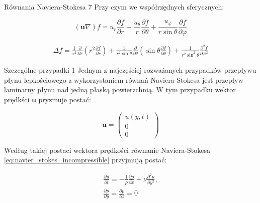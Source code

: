 \documentclass{beamer}
\begin{document}
\begin{frame}{Równania Naviera-Stokesa 7}
	Przy czym we współrzędnych sferycznych:

	\begin{equation}
		(\textbf{u}\nabla)f = u_r \frac{\partial f}{\partial r} +
		\frac{u_\theta}{r}\frac{\partial f}{\partial \theta} +
		\frac{u_\varphi}{r \sin \theta} \frac{\partial f}{\partial \varphi}
	\label{eq:convective_sphere}
	\end{equation}

	\begin{equation}
		\begin{split}
			\Delta f = \frac{1}{r^2}\frac{\partial}{\partial r}\left(r^2
			\frac{\partial f}{\partial r}\right) +
			\frac{1}{r^2 \sin \theta} \frac{\partial}{\partial \theta}
			\left(\sin \theta \frac{\partial f}{\partial \theta}\right) +
			 \frac{1}{r^2 \sin^2 \theta} \frac{\partial^2 f}{\partial \varphi^2}
		\end{split}
	\label{eq:laplace_sphere}
	\end{equation}
\end{frame}

\begin{frame}{Szczególne przypadki 1}
	Jednym z najczęściej rozważanych przypadków przepływu płynu lepkościowego
	z wykorzystaniem równań Naviera-Stokesa jest przepływ laminarny płynu
	nad jedną płaską powierzchnią. W tym przypadku wektor prędkści 
	\textbf{u} pryzmuje postać:

	\begin{equation}
		\textbf{u} = \begin{pmatrix}
		u(y,t) \\
		0 \\
		0
		\end{pmatrix}
		\label{eq:1stex_vel}
	\end{equation}

	Według takiej postaci wektora prędkości równanie Naviera-Stokesa \eqref{eq:navier_stokes_incompressible}
	przyjmują postać:

	\begin{equation}
		\begin{split}
		\frac{\partial u}{\partial t} = -\frac{1}{\rho} \frac{\partial p}{\partial x} +
		\nu \frac{\partial^2 u}{\partial y^2}, \\
		\frac{\partial p}{\partial y} = \frac{\partial p}{\partial z} = 0
		\end{split}
	\end{equation}
\end{frame}
\end{document}
